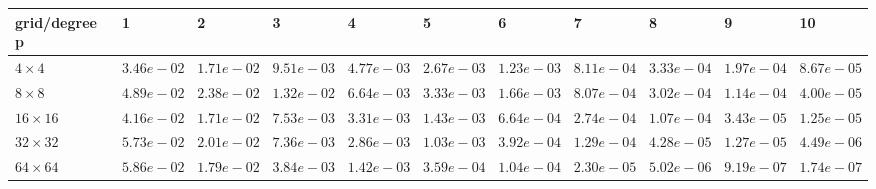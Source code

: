 \begin{tabular}{lllllllllll}
\hline
 grid/degree p   & 1          & 2          & 3          & 4          & 5          & 6          & 7          & 8          & 9          & 10         \\
\hline
 $4 \times 4$    & $3.46e-02$ & $1.71e-02$ & $9.51e-03$ & $4.77e-03$ & $2.67e-03$ & $1.23e-03$ & $8.11e-04$ & $3.33e-04$ & $1.97e-04$ & $8.67e-05$ \\
 $8 \times 8$    & $4.89e-02$ & $2.38e-02$ & $1.32e-02$ & $6.64e-03$ & $3.33e-03$ & $1.66e-03$ & $8.07e-04$ & $3.02e-04$ & $1.14e-04$ & $4.00e-05$ \\
 $16 \times 16$  & $4.16e-02$ & $1.71e-02$ & $7.53e-03$ & $3.31e-03$ & $1.43e-03$ & $6.64e-04$ & $2.74e-04$ & $1.07e-04$ & $3.43e-05$ & $1.25e-05$ \\
 $32 \times 32$  & $5.73e-02$ & $2.01e-02$ & $7.36e-03$ & $2.86e-03$ & $1.03e-03$ & $3.92e-04$ & $1.29e-04$ & $4.28e-05$ & $1.27e-05$ & $4.49e-06$ \\
 $64 \times 64$  & $5.86e-02$ & $1.79e-02$ & $3.84e-03$ & $1.42e-03$ & $3.59e-04$ & $1.04e-04$ & $2.30e-05$ & $5.02e-06$ & $9.19e-07$ & $1.74e-07$ \\
\hline
\end{tabular}